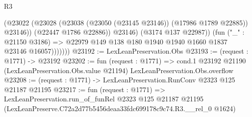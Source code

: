 \begin{lexlean}{R3}
\begin{coremodule}
                      (@23022
                        (@23028 (@23038 (@23050 (@23145 @23146)) (@17986 @1789 @22885)) @23146))
                      (@22447 @1786 @22886))
                    @23146)
                  (@3174 @137 @22987))
                (fun ("_" : @21150 @3186) =>
                @22979 @149 @138 @180 @1940 @1940 @1660 @1837 @23146 @16057)))))))
@23192 := LexLeanPreservation.Obs
@23193 := (request : @1771) -> @23192
@23202 := fun (request : @1771) =>
  cond.{1} @23192 @21190 (LexLeanPreservation.Obs.value @21194) LexLeanPreservation.Obs.overflow
@23208 := (request : @1771) -> LexLeanPreservation.RunConv @2323 @125 @21187 @21195
@23217 := fun (request : @1771) =>
  LexLeanPreservation.run_of_funRel
    @2323
    @125
    @21187
    @21195
    (LexLeanPreserve.C72a2d77b5456deaa33fdc699178c9c74.R3.__rel_0 @1624)
\end{coremodule}
\end{lexlean}
